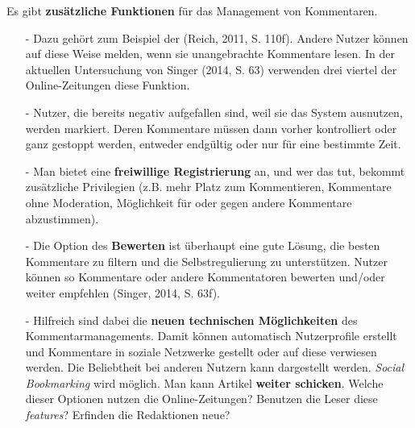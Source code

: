 Es gibt {\bfseries zusätzliche  Funktionen} für das Management von Kommentaren. 
\begin{itemize}
\item[-] Dazu gehört zum Beispiel der  \grqq\- (Reich, 2011, S. 110f). Andere Nutzer können auf diese Weise melden, wenn sie unangebrachte Kommentare lesen. In der aktuellen Untersuchung von Singer (2014, S. 63) verwenden drei viertel der Online-Zeitungen diese Funktion.  
\item[-] Nutzer, die bereits negativ aufgefallen sind, weil sie das System ausnutzen, werden markiert. Deren Kommentare müssen dann vorher kontrolliert oder ganz gestoppt werden, entweder endgültig oder nur für eine bestimmte Zeit. 
\item[-] Man bietet eine  {\bfseries freiwillige Registrierung} an, und wer das tut, bekommt zusätzliche Privilegien (z.B. mehr Platz zum Kommentieren, Kommentare ohne Moderation, Möglichkeit für oder gegen andere Kommentare abzustimmen). 
\item[-] Die Option des  {\bfseries \glqq Bewerten\grqq} ist überhaupt eine gute Lösung, die besten Kommentare zu filtern und die Selbstregulierung zu unterstützen. Nutzer können so Kommentare oder andere Kommentatoren bewerten und/oder weiter empfehlen (Singer, 2014, S. 63f).
 \item[-] Hilfreich sind dabei die {\bfseries neuen technischen Möglichkeiten} des Kommentarmanagements. Damit können
	 automatisch Nutzerprofile erstellt und Kommentare in soziale Netzwerke gestellt oder auf diese verwiesen
	 werden. Die Beliebtheit bei anderen Nutzern kann dargestellt werden. {\slshape Social Bookmarking} wird
	 möglich. Man kann Artikel  {\bfseries weiter schicken}. Welche dieser Optionen nutzen die Online-Zeitungen? Benutzen die Leser diese {\slshape features}? Erfinden die Redaktionen neue?

\end{itemize}






